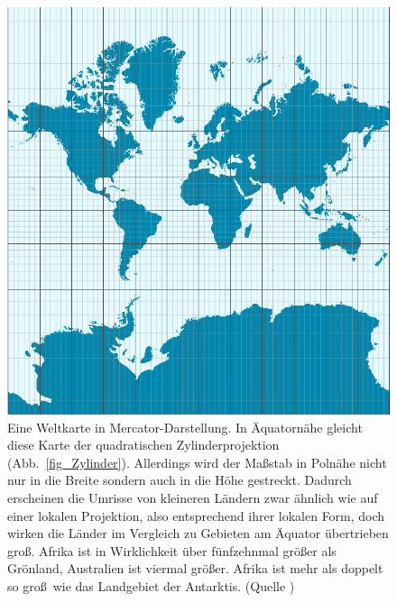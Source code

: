 \begin{figure}
\includegraphics[trim= 0cm 1.0cm 0.3cm 1.0cm,clip,scale=0.3]{./Bilder/Mercator-proj.png}
\caption{\label{fig_Mercator}%
Eine Weltkarte in Mercator-Darstellung. In \"Aquatorn\"ahe gleicht diese Karte der
quadratischen Zylinderprojektion (Abb.\ \ref{fig_Zylinder}). Allerdings wird der Ma\ss stab in
Poln\"ahe nicht nur in die Breite sondern auch in die H\"ohe gestreckt. Dadurch erscheinen
die Umrisse von kleineren L\"andern zwar \"ahnlich wie auf einer lokalen Projektion, also
entsprechend ihrer lokalen Form, doch wirken
die L\"ander im Vergleich zu Gebieten am \"Aquator \"ubertrieben gro\ss. Afrika ist in Wirklichkeit
\"uber f\"unfzehnmal gr\"o\ss er als Gr\"onland, Australien ist viermal gr\"o\ss er. Afrika ist 
mehr als doppelt so gro\ss\ wie das Landgebiet der Antarktis. (Quelle \cite{WikiMercator})}  
\end{figure}

